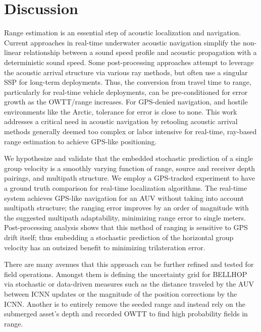 \section{\label{sec:4} Discussion}

Range estimation is an essential step of acoustic localization and navigation.
Current approaches in real-time underwater acoustic navigation simplify the non-linear relationship between a sound speed profile and acoustic propagation with a deterministic sound speed.
Some post-processing approaches attempt to leverage the acoustic arrival structure via various ray methods, but often use a singular SSP for long-term deployments.
Thus, the conversion from travel time to range, particularly for real-time vehicle deployments, can be pre-conditioned for error growth as the OWTT/range increases.
For GPS-denied navigation, and hostile environments like the Arctic, tolerance for error is close to none.
This work addresses a critical need in acoustic navigation by retooling acoustic arrival methods generally deemed too complex or labor intensive for real-time, ray-based range estimation to achieve GPS-like positioning.

We hypothesize and validate that the embedded stochastic prediction of a single group velocity is a smoothly varying function of range, source and receiver depth pairings, and multipath structure.
We employ a GPS-tracked experiment to have a ground truth comparison for real-time localization algorithms.
The real-time system achieves GPS-like navigation for an AUV without taking into account multipath structure; the ranging error improves by an order of magnitude with the suggested multipath adaptability, minimizing range error to single meters.
Post-processing analysis shows that this method of ranging is sensitive to GPS drift itself; thus embedding a stochastic prediction of the horizontal group velocity has an outsized benefit to minimizing trilateration error.

There are many avenues that this approach can be further refined and tested for field operations.
Amongst them is defining the uncertainty grid for BELLHOP via stochastic or data-driven measures such as the distance traveled by the AUV between ICNN updates or the magnitude of the position corrections by the ICNN.
Another is to entirely remove the seeded range and instead rely on the submerged asset's depth and recorded OWTT to find high probability fields in range.

